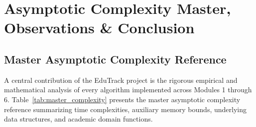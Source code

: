 \chapter{Asymptotic Complexity Master, Observations \& Conclusion}
\label{ch:conclusion}

\section{Master Asymptotic Complexity Reference}
A central contribution of the EduTrack project is the rigorous empirical and mathematical analysis of every algorithm implemented across Modules 1 through 6. Table~\ref{tab:master_complexity} presents the master asymptotic complexity reference summarizing time complexities, auxiliary memory bounds, underlying data structures, and academic domain functions.

